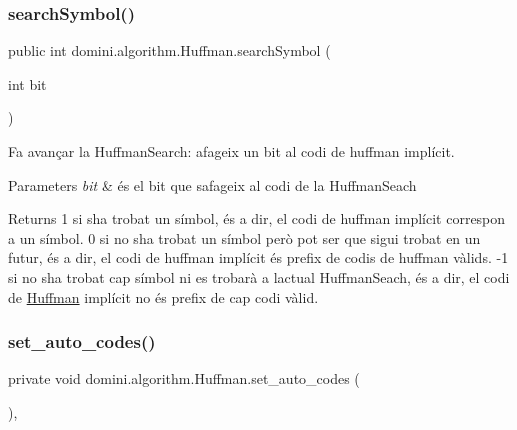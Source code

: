 \subsubsection{\texorpdfstring{search\+Symbol()}{searchSymbol()}}
{\footnotesize\ttfamily public int domini.\+algorithm.\+Huffman.\+search\+Symbol (\begin{DoxyParamCaption}\item[{int}]{bit }\end{DoxyParamCaption})\hspace{0.3cm}{\ttfamily [inline]}}



Fa avançar la Huffman\+Search\+: afageix un bit al codi de huffman implícit. 


\begin{DoxyParams}{Parameters}
{\em bit} & és el bit que s\textquotesingle{}afageix al codi de la Huffman\+Seach \\
\hline
\end{DoxyParams}
\begin{DoxyReturn}{Returns}
1 si s\textquotesingle{}ha trobat un símbol, és a dir, el codi de huffman implícit correspon a un símbol. 0 si no s\textquotesingle{}ha trobat un símbol però pot ser que sigui trobat en un futur, és a dir, el codi de huffman implícit és prefix de codis de huffman vàlids. -\/1 si no s\textquotesingle{}ha trobat cap símbol ni es trobarà a l\textquotesingle{}actual Huffman\+Seach, és a dir, el codi de \hyperlink{classdomini_1_1algorithm_1_1Huffman}{Huffman} implícit no és prefix de cap codi vàlid. 
\end{DoxyReturn}
\mbox{\label{classdomini_1_1algorithm_1_1Huffman_a82b44a2aaa1d3726263a79a6562b7a6f}} 
\subsubsection{\texorpdfstring{set\+\_\+auto\+\_\+codes()}{set\_auto\_codes()}}
{\footnotesize\ttfamily private void domini.\+algorithm.\+Huffman.\+set\+\_\+auto\+\_\+codes (\begin{DoxyParamCaption}{ }\end{DoxyParamCaption})\hspace{0.3cm}{\ttfamily [inline]}, {\ttfamily [private]}}



